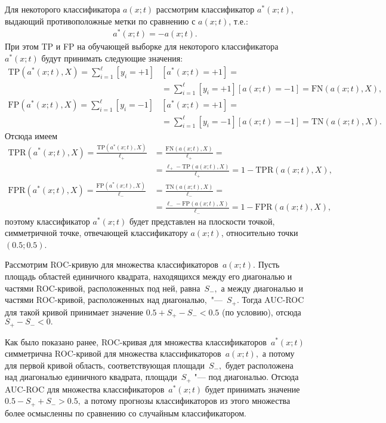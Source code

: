 \documentclass[12pt,a4paper]{article}
\begin{document}
	\begin{esSolution}
		
		Для некоторого классификатора $a(x;t)$ рассмотрим классификатор $a^*(x;t)$, выдающий противоположные метки по сравнению с $a(x;t)$, т.е.:
		\begin{align*}
		a^*(x;t) = -a(x;t).
		\end{align*}
		При этом TP и FP на обучающей выборке для некоторого классификатора $a^*(x;t)$ будут принимать следующие значения:
		\begin{align*}
			\text{TP}(a^*(x; t), X) = 
			\sum_{i=1}^\ell [y_i = +1]&[a^*(x;t) = +1] =\\
			&= \sum_{i=1}^\ell [y_i = +1][a(x;t) = -1] = 
			\text{FN}(a(x; t), X),\\
			\text{FP}(a^*(x; t), X) = 
			\sum_{i=1}^\ell [y_i = -1]&[a^*(x;t) = +1] =\\
			&=\sum_{i=1}^\ell [y_i = -1][a(x;t) = -1] = \text{TN}(a(x; t), X).			
		\end{align*}
		Отсюда имеем
		\begin{align*}
			\text{TPR}(a^*(x;t), X) = 
			\frac{\text{TP}(a^*(x;t), X)}{\ell_+} &= 
			\frac{\text{FN}(a(x;t), X)}{\ell_+} =\\
			&=\frac{\ell_+ - \text{TP}(a(x;t), X)}{\ell_+} 
			= 1 - \text{TPR}(a(x;t), X),\\
			\text{FPR}(a^*(x;t), X) = 
			\frac{\text{FP}(a^*(x;t), X)}{\ell_-} &= 
			\frac{\text{TN}(a(x;t), X)}{\ell_-} =\\
			&=\frac{\ell_- - \text{FP}(a(x;t), X)}{\ell_-} 
			= 1 - \text{FPR}(a(x;t), X),			
		\end{align*}
		поэтому классификатор $a^*(x;t)$ будет представлен на плоскости точкой, симметричной точке, отвечающей классификатору $a(x;t)$, относительно точки~$\left(0.5; 0.5 \right)$. 
		
		Рассмотрим ROC-кривую для множества классификаторов~$a(x;t).$ Пусть площадь областей единичного квадрата, находящихся между его диагональю и частями ROC-кривой, расположенных под ней, равна~$S_-,$ а между диагональю и частями ROC-кривой, расположенных над диагональю,~"---~$S_+.$ Тогда AUC-ROC для такой кривой принимает значение $0.5 + S_+ - S_- < 0.5$ (по условию), отсюда~$S_+ - S_- < 0.$
		
		Как было показано ранее, ROC-кривая для множества классификаторов~$a^*(x;t)$ симметрична ROC-кривой для множества классификаторов~$a(x;t),$ а потому для первой кривой область, соответствующая площади~$S_-,$ будет расположена над диагональю единичного квадрата, площади~$S_+$ "--- под диагональю. Отсюда AUC-ROC для множества классификаторов~$a^*(x;t)$ будет принимать значение $0.5 - S_+ + S_- > 0.5,$ а потому прогнозы классификаторов из этого множества  более осмысленны по сравнению со случайным классификатором.
	\end{esSolution}
\end{document}
